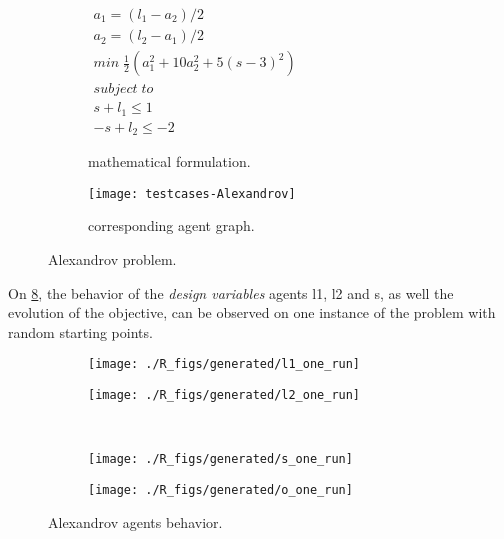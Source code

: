 \begin{figure}
\centering
	\begin{subfigure}[b]{0.4\textwidth}
		$\begin{array}{c}
			a_1 = (l_1 - a_2)/2 \\
			a_2 = (l_2 - a_1)/2 \\
			min \; \frac{1}{2}(a_1^2 + 10a_2^2 + 5(s-3)^2) \\
			subject \; to \\
			s + l_1 \leq 1 \\
			-s + l_2 \leq -2
		\end{array}$
		\caption{mathematical formulation.}\label{alexandrov:math}
	\end{subfigure}
	\hfill%
	\begin{subfigure}[b]{0.59\textwidth}
		\texttt{[image: testcases-Alexandrov]}%
		\caption{corresponding agent graph.}\label{alexandrov:graph}
	\end{subfigure}
\caption{Alexandrov problem.}\label{alexandrov}
\end{figure}

On \figurename{} \ref{alexandrov_res_one}, the behavior of the \emph{design variables} agents l1, l2 and s, as well the evolution of the objective, can be observed on one instance of the problem with random starting points.

\begin{figure}
\centering
	\begin{subfigure}[b]{0.4\textwidth}
		\centering
		\texttt{[image: ./R\_figs/generated/l1\_one\_run]}
		\label{alexandrov_res_one:l1}
	\end{subfigure}
	\begin{subfigure}[b]{0.4\textwidth}
		\centering
		\texttt{[image: ./R\_figs/generated/l2\_one\_run]}
		\label{alexandrov_res_one:l2}
	\end{subfigure}
	\vspace{-20pt}
	\\
	\begin{subfigure}[b]{0.4\textwidth}
		\centering
		\texttt{[image: ./R\_figs/generated/s\_one\_run]}
		\label{alexandrov_res_one:s}
	\end{subfigure}
	\begin{subfigure}[b]{0.4\textwidth}
		\centering
		\texttt{[image: ./R\_figs/generated/o\_one\_run]}
		\label{alexandrov_res_one:o}
	\end{subfigure}
	
	\caption{Alexandrov agents behavior.}
	\label{alexandrov_res_one}

\end{figure}

